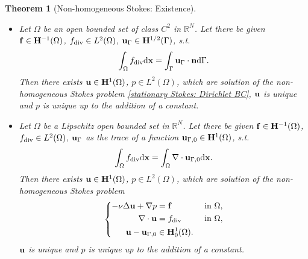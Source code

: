 \documentclass[oneside,11pt]{book}
\numberwithin{equation}{section}
\newtheorem{theorem}{Theorem}[section]
\begin{document}
\begin{theorem}[Non-homogeneous Stokes: Existence]
    \begin{itemize}
        \item[(i)] Let $\Omega$ be an open bounded set of class $C^2$ in $\mathbb{R}^N$. Let there be given ${\bf f}\in{\bf H}^{-1}(\Omega)$, $f_{\rm div}\in L^2(\Omega)$, ${\bf u}_\Gamma\in{\bf H}^{1/2}(\Gamma)$, s.t.
        \begin{align*}
            \int_\Omega f_{\rm div}{\rm d}{\bf x} = \int_\Gamma {\bf u}_\Gamma\cdot{\bf n}{\rm d}\Gamma.
        \end{align*}
        Then there exists ${\bf u}\in{\bf H}^1(\Omega)$, $p\in L^2(\Omega)$, which are solution of the non-homogeneous Stokes problem \eqref{stationary Stokes: Dirichlet BC}, ${\bf u}$ is unique and $p$ is unique up to the addition of a constant.
        \item[(ii)] Let $\Omega$ be a Lipschitz open bounded set in $\mathbb{R}^N$. Let there be given ${\bf f}\in{\bf H}^{-1}(\Omega)$, $f_{\rm div}\in L^2(\Omega)$, ${\bf u}_\Gamma$ as the trace of a function ${\bf u}_{\Gamma,0}\in{\bf H}^1(\Omega)$, s.t.
        \begin{align*}
            \int_\Omega f_{\rm div}{\rm d}{\bf x} = \int_\Omega \nabla\cdot{\bf u}_{\Gamma,0}{\rm d}{\bf x}.
        \end{align*}
        Then there exists ${\bf u}\in{\bf H}^1(\Omega)$, $p\in L^2(\Omega)$, which are solution of the non-homogeneous Stokes problem
        \begin{equation*}
            \left\{\begin{split}
                -\nu\Delta{\bf u} + \nabla p &= {\bf f} &&\mbox{ in } \Omega,\\
                \nabla\cdot{\bf u} &= f_{\rm div} &&\mbox{ in } \Omega,\\
                {\bf u} - {\bf u}_{\Gamma,0}&\in{\bf H}_0^1(\Omega).
            \end{split}\right.
        \end{equation*}
        ${\bf u}$ is unique and $p$ is unique up to the addition of a constant.
    \end{itemize}
\end{theorem}
\end{document}

